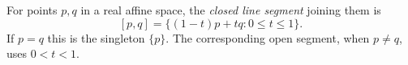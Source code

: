 
For points $p,q$ in a real affine space, the \emph{closed line segment} joining them is
\[
[p,q]=\{(1-t)p+tq:0\le t\le1\}.
\]
If $p=q$ this is the singleton $\{p\}$. The corresponding open segment, when $p\ne q$, uses $0<t<1$.
